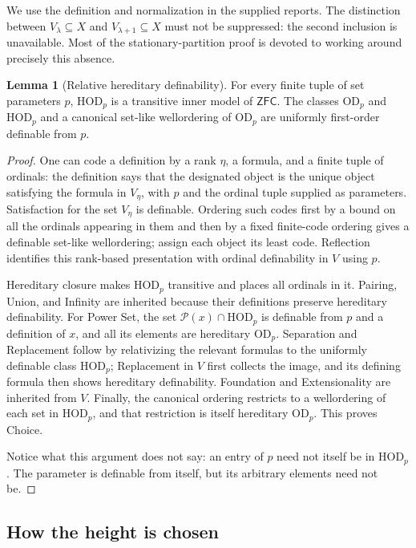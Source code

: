 \documentclass[11pt,letterpaper]{article}
\theoremstyle{definition}
\newtheorem{lemma}[definition]{Lemma}
\numberwithin{equation}{section}
\newcommand{\ZFC}{\mathsf{ZFC}}
\newcommand{\HOD}{\mathrm{HOD}}
\newcommand{\OD}{\mathrm{OD}}
\newcommand{\Pow}{\mathcal P}
\begin{document}
We use the definition and normalization in the supplied reports. The distinction between $V_\lambda\subseteq X$ and $V_{\lambda+1}\subseteq X$ must not be suppressed: the second inclusion is unavailable. Most of the stationary-partition proof is devoted to working around precisely this absence.

\begin{lemma}[Relative hereditary definability]\label{lem:hod}
For every finite tuple of set parameters $p$, $\HOD_p$ is a transitive inner model of $\ZFC$. The classes $\OD_p$ and $\HOD_p$ and a canonical set-like wellordering of $\OD_p$ are uniformly first-order definable from $p$.
\end{lemma}

\begin{proof}
One can code a definition by a rank $\eta$, a formula, and a finite tuple of ordinals: the definition says that the designated object is the unique object satisfying the formula in $V_\eta$, with $p$ and the ordinal tuple supplied as parameters. Satisfaction for the set $V_\eta$ is definable. Ordering such codes first by a bound on all the ordinals appearing in them and then by a fixed finite-code ordering gives a definable set-like wellordering; assign each object its least code. Reflection identifies this rank-based presentation with ordinal definability in $V$ using $p$.

Hereditary closure makes $\HOD_p$ transitive and places all ordinals in it. Pairing, Union, and Infinity are inherited because their definitions preserve hereditary definability. For Power Set, the set $\Pow(x)\cap\HOD_p$ is definable from $p$ and a definition of $x$, and all its elements are hereditary $\OD_p$. Separation and Replacement follow by relativizing the relevant formulas to the uniformly definable class $\HOD_p$; Replacement in $V$ first collects the image, and its defining formula then shows hereditary definability. Foundation and Extensionality are inherited from $V$. Finally, the canonical ordering restricts to a wellordering of each set in $\HOD_p$, and that restriction is itself hereditary $\OD_p$. This proves Choice.

Notice what this argument does not say: an entry of $p$ need not itself be in $\HOD_p$. The parameter is definable from itself, but its arbitrary elements need not be.
\end{proof}

\subsection{How the height is chosen}\label{subsec:height}
\end{document}
